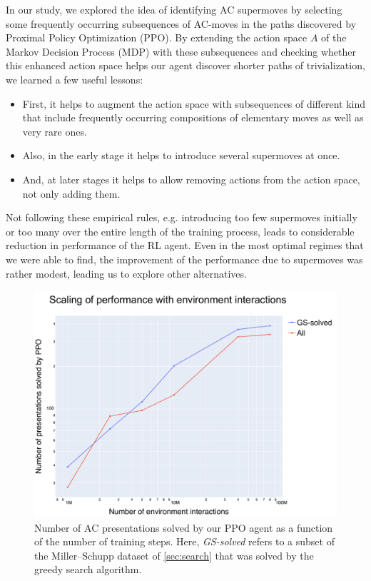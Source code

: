 In our study, we explored the idea of identifying AC supermoves by selecting some frequently occurring subsequences of AC-moves in the paths discovered by Proximal Policy Optimization (PPO). By extending the action space $A$ of the Markov Decision Process (MDP) with these subsequences and checking whether this enhanced action space helps our agent discover shorter paths of trivialization, we learned a few useful lessons:

\begin{itemize}
	
	\item First, it helps to augment the action space with subsequences of different kind that include frequently occurring compositions of elementary moves as well as very rare ones.
	
	\item Also, in the early stage it helps to introduce several supermoves at once.
	
	\item And, at later stages it helps to allow removing actions from the action space, not only adding them.
\end{itemize}

\noindent
Not following these empirical rules, e.g. introducing too few supermoves initially or too many over the entire length of the training process, leads to considerable reduction in performance of the RL agent. Even in the most optimal regimes that we were able to find, the improvement of the performance due to supermoves was rather modest, leading us to explore other alternatives.

\begin{figure}
	\centering
	\includegraphics[scale=0.35]{fig/scaling_env.pdf}
	\caption{Number of AC presentations solved by our PPO agent as a function of the number of training steps. Here, \textit{GS-solved} refers to a subset of the Miller--Schupp dataset of \autoref{sec:search} that was solved by the greedy search algorithm.}
	\label{fig:scaling_env}
\end{figure}


